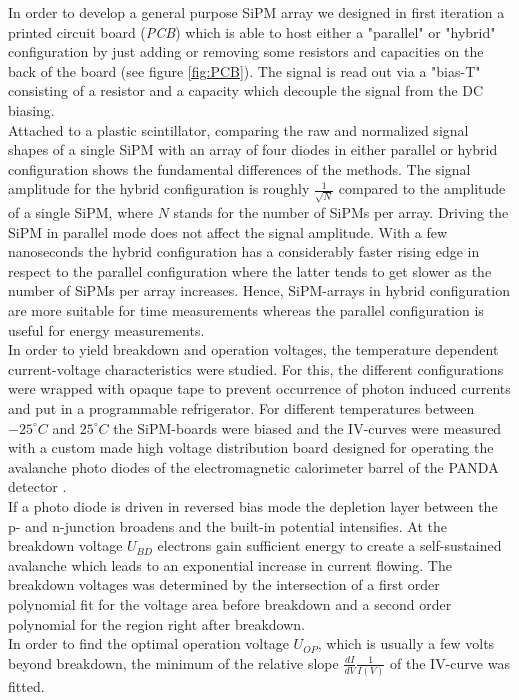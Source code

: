 \documentclass[%
 reprint,
 amsmath,amssymb,
 aps,
]{revtex4-1}
\newcommand{\tit}[1]{\textit{#1}}
\begin{document}
In order to develop a general purpose SiPM array we designed in first iteration a printed circuit board (\tit{PCB}) which is able to host either a "parallel" or "hybrid" configuration by just adding or removing some resistors and capacities on the back of the board (see figure \ref{fig:PCB}). The signal is read out via a "bias-T" consisting of a resistor and a capacity which decouple the signal from the DC biasing.  \\ \indent
Attached to a plastic scintillator, comparing the raw and normalized signal shapes of a single SiPM with an array of four diodes in either parallel or hybrid configuration shows the fundamental differences of the methods. The signal amplitude for the hybrid configuration is roughly $\frac{1}{\sqrt{N}}$ compared to the amplitude of a single SiPM, where $N$ stands for the number of SiPMs per array. Driving the SiPM in parallel mode does not affect the signal amplitude. With a few nanoseconds the hybrid configuration has a considerably faster rising edge in respect to the parallel configuration where the latter tends to get slower as the number of SiPMs per array increases. Hence, SiPM-arrays in hybrid configuration are more suitable for time measurements whereas the parallel configuration is useful for energy measurements. \\ \indent
In order to yield breakdown and operation voltages, the temperature dependent current-voltage characteristics were studied. For this, the different configurations were wrapped with opaque tape to prevent occurrence of photon induced currents and put in a programmable refrigerator. For different temperatures between $-25^{\circ}C $ and $25^{\circ}C$ the SiPM-boards were biased and the IV-curves were measured with a custom made high voltage distribution board designed for operating the avalanche photo diodes of the electromagnetic calorimeter barrel of the PANDA detector \cite{chris}. \\ \indent
If a photo diode is driven in reversed bias mode the depletion layer between the p- and n-junction broadens and the built-in potential intensifies. At the breakdown voltage $U_{BD}$ electrons gain sufficient energy to create a self-sustained avalanche which leads to an exponential increase in current flowing. The breakdown voltages was determined by the intersection of a first order polynomial fit for the voltage area before breakdown and a second order polynomial for the region right after breakdown. \\ \indent
In order to find the optimal operation voltage $U_{OP}$, which is usually a few volts beyond breakdown, the minimum of the relative slope $\frac{dI}{dV}\frac{1}{I(V)}$ of the IV-curve was fitted. \\ \indent 
\end{document}
